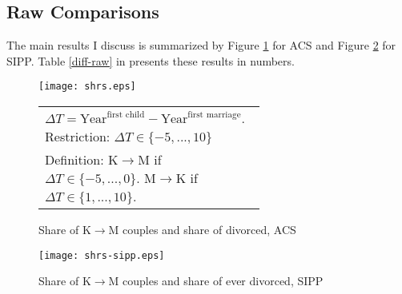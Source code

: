 \documentclass[12pt,letter]{article}
\begin{document}
\subsection{Raw Comparisons\label{keycomp}}
The main results I discuss is summarized by Figure \ref{shrs} for ACS and Figure \ref{shrs-sipp} for SIPP. Table \ref{diff-raw} in presents these results in numbers.


\begin{figure}[h!]
\centering
\texttt{[image: shrs.eps]}
\begin{tabular}{|p{0.65\linewidth}|}
\hline
\footnotesize $\Delta T = \text{Year}^{\text{first child}} - \text{Year}^{\text{first marriage}}$. Restriction: $\Delta T \in \{-5,...,10\}$\\
\footnotesize Definition: K$\to$M if $\Delta T \in \{-5,...,0\}$. M$\to$K if $\Delta T \in \{1,...,10\}$.\\\hline
\end{tabular}
\caption{Share of K$\to$M couples and share of divorced, ACS\label{shrs}}
\end{figure}



\begin{figure}[h!]
\centering
\texttt{[image: shrs-sipp.eps]}
\caption{Share of K$\to$M couples and share of ever divorced, SIPP\label{shrs-sipp}}
\end{figure}
\end{document}

